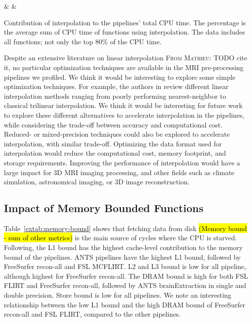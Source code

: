 \documentclass[conference]{IEEEtran}
\newcommand{\MD}[1]{\color{magenta}\textsc{From Mathieu: }#1\color{black}}
\newcommand{\HL}[1]{\hl{#1}}
\begin{document}
\begin{table}[ht]
	\centering
	{\pipeline & \nfunc & \tablenum[round-precision=2]{\cputime}}
	\caption{Contribution of interpolation to the pipelines' total CPU time. The percentage is the average sum of CPU time of functions using interpolation. The data includes all functions; not only the top 80\% of the CPU time.}
	\label{extab:interpolation}
\end{table}

Despite an extensive literature on linear interpolation \MD{TODO cite it}, no particular optimization techniques are available in the MRI pre-processing pipelines we profiled. We think it would be interesting to explore some simple optimization techniques. For example, the authors in \cite{Canelhas2018-vs} review different linear interpolation methods ranging from poorly performing nearest-neighbor to classical trilinear interpolation. We think it would be interesting for future work to explore these different alternatives to accelerate interpolation in the pipelines, while considering the trade-off between accuracy and computational cost. Reduced- or mixed-precision techniques could also be explored to accelerate interpolation, with similar trade-off. Optimizing the data format used for interpolation would reduce the computational cost, memory footprint, and storage requirements. Improving the performance of interpolation would have a large impact for 3D MRI imaging processing, and other fields such as climate simulation, astronomical imaging, or 3D image reconstruction.

\subsection{Impact of Memory Bounded Functions}
Table~\ref{extab:memory-bound} shows that fetching data from disk \HL{(Memory bound - sum of other metrics)} is the main source of cycles where the CPU is starved. Following, the L1 bound has the highest cache-level contribution to the memory bound of the pipelines. ANTS pipelines have the highest L1 bound, followed by FreeSurfer recon-all and FSL MCFLIRT. L2 and L3 bound is low for all pipeline, although highest for FreeSurfer recon-all. The DRAM bound is high for both FSL FLIRT and FreeSurfer recon-all, followed by ANTS brainExtraction in single and double precision. Store bound is low for all pipelines. We note an interesting relationship between the low L1 bound and the high DRAM bound of FreeSurfer recon-all and FSL FLIRT, compared to the other pipelines.
\end{document}
